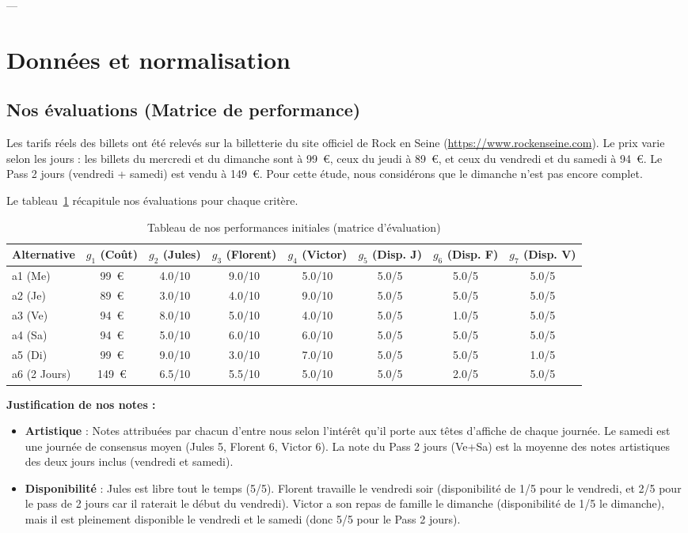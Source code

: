 \documentclass[11pt,a4paper]{article}
\begin{document}
---

\section{Données et normalisation}
\label{sec:donnees}

\subsection{Nos évaluations (Matrice de performance)}
Les tarifs réels des billets ont été relevés sur la billetterie du site officiel de Rock en Seine (\url{https://www.rockenseine.com}). Le prix varie selon les jours : les billets du mercredi et du dimanche sont à 99~€, ceux du jeudi à 89~€, et ceux du vendredi et du samedi à 94~€. Le Pass 2 jours (vendredi + samedi) est vendu à 149~€. Pour cette étude, nous considérons que le dimanche n'est pas encore complet.

Le tableau~\ref{tab:perf_original} récapitule nos évaluations pour chaque critère.

\begin{table}[H]
  \centering
  \caption{Tableau de nos performances initiales (matrice d'évaluation)}
  \label{tab:perf_original}
  \begin{tabular}{lccccccc}
    \toprule
    Alternative & $g_1$ (Coût) & $g_2$ (Jules) & $g_3$ (Florent) & $g_4$ (Victor) & $g_5$ (Disp. J) & $g_6$ (Disp. F) & $g_7$ (Disp. V) \\
    \midrule
    a1 (Me) & 99~€ & 4.0/10 & 9.0/10 & 5.0/10 & 5.0/5 & 5.0/5 & 5.0/5 \\
    a2 (Je) & 89~€ & 3.0/10 & 4.0/10 & 9.0/10 & 5.0/5 & 5.0/5 & 5.0/5 \\
    a3 (Ve) & 94~€ & 8.0/10 & 5.0/10 & 4.0/10 & 5.0/5 & 1.0/5 & 5.0/5 \\
    a4 (Sa) & 94~€ & 5.0/10 & 6.0/10 & 6.0/10 & 5.0/5 & 5.0/5 & 5.0/5 \\
    a5 (Di) & 99~€ & 9.0/10 & 3.0/10 & 7.0/10 & 5.0/5 & 5.0/5 & 1.0/5 \\
    a6 (2 Jours) & 149~€ & 6.5/10 & 5.5/10 & 5.0/10 & 5.0/5 & 2.0/5 & 5.0/5 \\
    \bottomrule
  \end{tabular}
\end{table}

\textbf{Justification de nos notes :}
\begin{itemize}
    \item \textbf{Artistique} : Notes attribuées par chacun d'entre nous selon l'intérêt qu'il porte aux têtes d'affiche de chaque journée. Le samedi est une journée de consensus moyen (Jules 5, Florent 6, Victor 6). La note du Pass 2 jours (Ve+Sa) est la moyenne des notes artistiques des deux jours inclus (vendredi et samedi).
    \item \textbf{Disponibilité} : Jules est libre tout le temps (5/5). Florent travaille le vendredi soir (disponibilité de 1/5 pour le vendredi, et 2/5 pour le pass de 2 jours car il raterait le début du vendredi). Victor a son repas de famille le dimanche (disponibilité de 1/5 le dimanche), mais il est pleinement disponible le vendredi et le samedi (donc 5/5 pour le Pass 2 jours).
\end{itemize}
\end{document}
